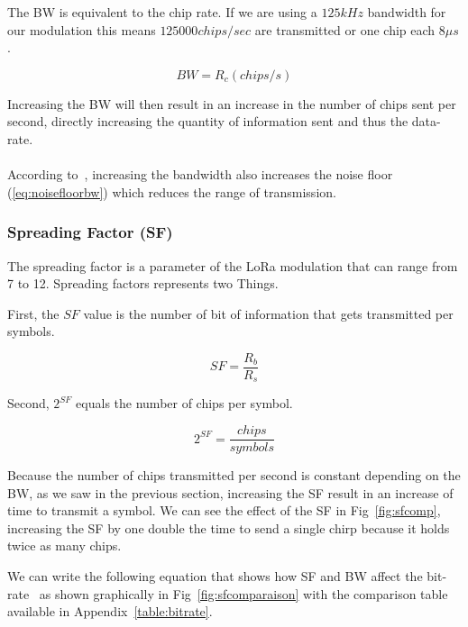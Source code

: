 The BW is equivalent to the chip rate. If we are using a $125 kHz$ bandwidth
for our modulation this means $125000 chips / sec$ are transmitted or one chip
each $8 \mu s$.

\begin{equation}
  BW = R_c (chips/s)
\end{equation}

Increasing the BW will then result in an increase in the number of chips sent
per second, directly increasing the quantity of information sent and thus the
data-rate.

\paragraph{}

According to~\cite{semtech:modulationbasics}, increasing the
bandwidth also increases the noise floor (\ref{eq:noisefloorbw}) which reduces
the range of transmission.

\subsubsection{Spreading Factor (SF)}

The spreading factor is a parameter of the LoRa modulation that can range from 7 to 12.
Spreading factors represents two Things.

First, the $SF$ value is the number of bit of information that gets transmitted
per symbols.

\begin{equation}
 \label{eq:sf1}
  SF = \frac{R_b}{R_s}
\end{equation}

Second, $2^{SF}$ equals the number of chips per symbol.

\begin{equation}
 \label{eq:sf2}
  2^{SF} = \frac{chips}{symbols}
\end{equation}

Because the number of chips transmitted per second is constant depending on the BW,
as we saw in the previous section, increasing the SF result in an increase of
time to transmit a symbol.
We can see the effect of the SF in Fig~\ref{fig:sfcomp},
increasing the SF by one double the time to send a single chirp because it holds
twice as many chips.

We can write the following equation that shows how SF and BW affect the
bit-rate~\cite{semtech:modemdesign} as shown graphically in Fig~\ref{fig:sfcomparaison}
with the comparison table available in Appendix~\ref{table:bitrate}.

